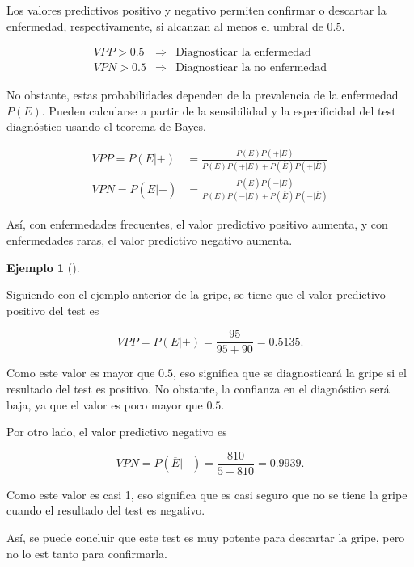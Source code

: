 \documentclass[
  spanish,
  a4paper,
]{scrreport}
\theoremstyle{plain}
\theoremstyle{definition}
\newtheorem{example}{Ejemplo}[chapter]
\theoremstyle{definition}
\theoremstyle{remark}
\begin{document}
\begin{tcolorbox}[enhanced jigsaw, arc=.35mm, bottomrule=.15mm, bottomtitle=1mm, breakable, colback=white, colbacktitle=quarto-callout-note-color!10!white, colframe=quarto-callout-note-color-frame, coltitle=black, left=2mm, leftrule=.75mm, opacityback=0, opacitybacktitle=0.6, rightrule=.15mm, title=\textcolor{quarto-callout-note-color}{\faInfo}\hspace{0.5em}{Interpretación}, titlerule=0mm, toprule=.15mm, toptitle=1mm]

Los valores predictivos positivo y negativo permiten confirmar o
descartar la enfermedad, respectivamente, si alcanzan al menos el umbral
de \(0.5\).

\[
\begin{array}{rcl}
VPP>0.5 & \Rightarrow & \mbox{Diagnosticar la enfermedad}\\
VPN>0.5 & \Rightarrow & \mbox{Diagnosticar la no enfermedad} 
\end{array}
\]

\end{tcolorbox}

No obstante, estas probabilidades dependen de la prevalencia de la
enfermedad \(P(E)\). Pueden calcularse a partir de la sensibilidad y la
especificidad del test diagnóstico usando el teorema de Bayes.

\begin{align*}
VPP=P(E|+) &= \frac{P(E)P(+|E)}{P(E)P(+|E)+P(\overline{E})P(+|\overline{E})}\\
VPN=P(\overline{E}|-) &= \frac{P(\overline{E})P(-|\overline{E})}{P(E)P(-|E)+P(\overline{E})P(-|\overline{E})}
\end{align*}

Así, con enfermedades frecuentes, el valor predictivo positivo aumenta,
y con enfermedades raras, el valor predictivo negativo aumenta.

\begin{example}[]\protect\hypertarget{exm-valores-predictivos}{}\label{exm-valores-predictivos}

Siguiendo con el ejemplo anterior de la gripe, se tiene que el valor
predictivo positivo del test es

\[VPP = P(E|+) = \frac{95}{95+90} = 0.5135.\]

Como este valor es mayor que \(0.5\), eso significa que se diagnosticará
la gripe si el resultado del test es positivo. No obstante, la confianza
en el diagnóstico será baja, ya que el valor es poco mayor que \(0.5\).

Por otro lado, el valor predictivo negativo es

\[VPN = P(\overline{E}|-) = \frac{810}{5+810} = 0.9939.\]

Como este valor es casi 1, eso significa que es casi seguro que no se
tiene la gripe cuando el resultado del test es negativo.

Así, se puede concluir que este test es muy potente para descartar la
gripe, pero no lo est tanto para confirmarla.

\end{example}
\end{document}
